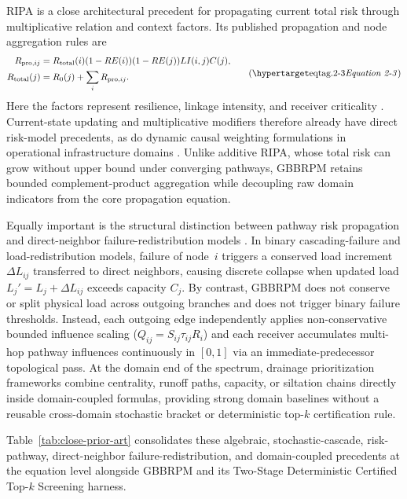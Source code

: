 RIPA is a close architectural precedent for propagating current total
risk through multiplicative relation and context factors. Its published
propagation and node aggregation rules are
\[
\begin{aligned}
R_{\mathrm{pro},ij}
&=R_{\mathrm{total}}(i)(1-RE(i))(1-RE(j))LI(i,j)C(j),\\
R_{\mathrm{total}}(j)
&=R_0(j)+\sum_i R_{\mathrm{pro},ij}.
\end{aligned}
\eqtag{2-3}
\]
Here the factors represent resilience, linkage intensity, and receiver
criticality \citep{faraji2026}. Current-state updating and multiplicative
modifiers therefore already have direct risk-model precedents, as do
dynamic causal weighting formulations in operational infrastructure
domains \citep{wu2026}. Unlike additive RIPA, whose total risk can grow
without upper bound under converging pathways, GBBRPM retains bounded
complement-product aggregation while decoupling raw domain indicators
from the core propagation equation.

Equally important is the structural distinction between pathway risk
propagation and direct-neighbor failure-redistribution models
\citep{buldyrev2010,he2019,shuang2017}. In binary cascading-failure and
load-redistribution models, failure of node~$i$ triggers a conserved load
increment $\Delta L_{ij}$ transferred to direct neighbors, causing
discrete collapse when updated load $L_j' = L_j + \Delta L_{ij}$ exceeds
capacity $C_j$. By contrast, GBBRPM does not conserve or split physical
load across outgoing branches and does not trigger binary failure
thresholds. Instead, each outgoing edge independently applies
non-conservative bounded influence scaling ($Q_{ij} = S_{ij}\tau_{ij}R_i$)
and each receiver accumulates multi-hop pathway influences continuously in
$[0,1]$ via an immediate-predecessor topological pass. At the domain end
of the spectrum, drainage prioritization frameworks
\citep{simone2023,dastgir2023,zhang2025} combine centrality, runoff paths,
capacity, or siltation chains directly inside domain-coupled formulas,
providing strong domain baselines without a reusable cross-domain
stochastic bracket or deterministic top-$k$ certification rule.

Table~\ref{tab:close-prior-art} consolidates these algebraic,
stochastic-cascade, risk-pathway, direct-neighbor failure-redistribution,
and domain-coupled precedents at the equation level alongside GBBRPM and
its Two-Stage Deterministic Certified Top-$k$ Screening harness.



